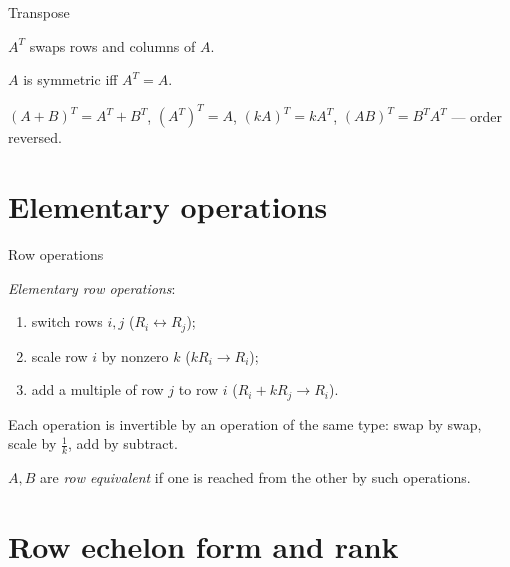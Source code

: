 \begin{frame}{Transpose}
\begin{definition}
$A^T$ swaps rows and columns of $A$.
\end{definition}

\pause

\begin{fact}
$A$ is symmetric iff $A^T=A$.
\end{fact}

\pause

\begin{theorem}
$(A+B)^T=A^T+B^T$, \quad $(A^T)^T=A$, \quad $(kA)^T=kA^T$, \quad $(AB)^T = B^T A^T$ — order reversed.
\end{theorem}
\end{frame}

\section{Elementary operations}

\begin{frame}{Row operations}
\begin{definition}
\emph{Elementary row operations}:
\begin{enumerate}
\item switch rows $i,j$ \quad ($R_i\leftrightarrow R_j$);
\item scale row $i$ by nonzero $k$ \quad ($kR_i\to R_i$);
\item add a multiple of row $j$ to row $i$ \quad ($R_i+kR_j\to R_i$).
\end{enumerate}
\end{definition}

\pause

\begin{theorem}
Each operation is invertible by an operation of the same type: swap by swap, scale by $\tfrac1k$, add by
subtract.
\end{theorem}

\pause

\begin{definition}
$A,B$ are \emph{row equivalent} if one is reached from the other by such operations.
\end{definition}
\end{frame}

\section{Row echelon form and rank}

